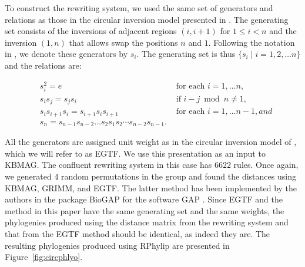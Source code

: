 \documentclass[12pt,a4paper]{amsart}
\newcommand{\id}{e}
\numberwithin{equation}{section}
\begin{document}
To construct the rewriting system, we used the same set of generators and relations as those in the circular inversion model presented in \citet{egrinagy2013group}. The generating set consists of the inversions of adjacent regions $(i, i+1)$ for $1 \leq i < n$ and the inversion $(1,n)$ that allows swap the positions $n$ and $1$. Following the notation in \citet{egrinagy2013group}, we denote these generators by $s_i$. The generating set is thus $\{s_i \mid i=1,2,\dots n\}$ and the relations are:

\begin{align*}
&s_i^2 = \id & \text{ for each } i=1, \dots n, \\
&s_i s_j = s_j s_i & \text{ if } i-j \bmod n \neq 1, \\
&s_i s_{i+1} s_i = s_{i+1} s_i s_{i+1} & \text{ for each } i=1, \dots n-1, and\\
&s_n = s_{n-1} s_{n-2} \dots s_2 s_1 s_2 \cdots s_{n-2} s_{n-1}.
\end{align*}

All the generators are assigned unit weight as in the circular inversion model of \citet{egrinagy2013group}, which we will refer to as EGTF. 
We use this presentation as an input to KBMAG.  The confluent rewriting system in this case has $6622$ rules.  Once again, we generated $4$ random permutations in the group and found the distances using KBMAG, GRIMM, and EGTF. The latter method has been implemented by the authors in the package BioGAP \citep{egri2014bacterial} for the software GAP \citep{Sch97}. Since EGTF and the method in this paper have the same generating set and the same weights, the phylogenies produced using the distance matrix from the rewriting system and that from the EGTF method should be identical, as indeed they are.
The resulting phylogenies produced using RPhylip are presented in Figure~\ref{fig:circphlyo}. 
\end{document}

